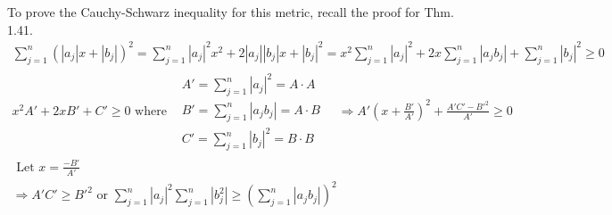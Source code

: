 \documentclass[twoside]{amsart}
\theoremstyle{plain}
\theoremstyle{definition}
\begin{document}
To prove the Cauchy-Schwarz inequality for this metric, recall the proof for Thm. 1.41.  
\[
\begin{gathered}
  \sum_{j=1}^n (|a_j|x + |b_j|)^2 = \sum_{j=1}^n |a_j|^2 x^2 + 2 |a_j||b_j|x + |b_j|^2 = x^2 \sum_{j=1}^n |a_j|^2 + 2x \sum_{j=1}^n |a_j b_j | + \sum_{j=1}^n |b_j|^2 \geq 0 \\
  x^2 A' + 2xB' + C' \geq 0 \text{ where} \begin{aligned}
    & A' = \sum_{j=1}^n |a_j|^2 = A\cdot A \\
    & B' = \sum_{j=1}^n |a_j b_j| = A \cdot B \\
    & C' = \sum_{j=1}^n |b_j|^2 = B \cdot B
\end{aligned} \quad \Longrightarrow A' \left( x+ \frac{B'}{A'} \right)^2 + \frac{ A'C' - B'^2}{A'} \geq 0 \\
  \text{ Let } x = \frac{-B'}{A'} \\
  \Longrightarrow A'C' \geq B'^2 \text{ or } \boxed{ \sum_{j=1}^n |a_j|^2 \sum_{j=1}^n |b_j^2 | \geq (\sum_{j=1}^n |a_j b_j|)^2 }
\end{gathered}
\]
\end{document}
